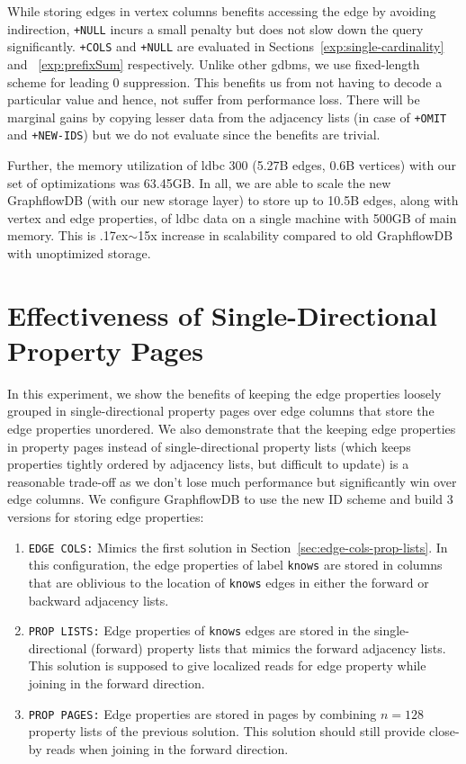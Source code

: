 While storing edges in vertex columns benefits accessing the edge by avoiding indirection, \texttt{+NULL} incurs a small penalty but does not slow down the query significantly. \texttt{+COLS} and \texttt{+NULL} are evaluated in Sections~\ref{exp:single-cardinality} and ~\ref{exp:prefixSum} respectively. Unlike other \gls{gdbms}, we use fixed-length scheme for leading 0 suppression. This benefits us from not having to decode a particular value and hence, not suffer from performance loss. There will be marginal gains by copying lesser data from the adjacency lists (in case of \texttt{+OMIT} and \texttt{+NEW-IDS}) but we do not evaluate since the benefits are trivial.

Further, the memory utilization of \gls{ldbc} 300 (5.27B edges, 0.6B vertices) with our set of optimizations was 63.45GB. In all, we are able to scale the new GraphflowDB (with our new storage layer) to store up to 10.5B edges, along with vertex and edge properties, of \gls{ldbc} data on a single machine with 500GB of main memory. This is {\raise.17ex\hbox{$\scriptstyle\sim$}}15x increase in scalability compared to old GraphflowDB with unoptimized storage.

\section{Effectiveness of Single-Directional Property Pages}
\label{exp:property-pages}

In this experiment, we show the benefits of keeping the edge properties loosely grouped in single-directional property pages over edge columns that store the edge properties unordered. We also demonstrate that the keeping edge properties in property pages instead of single-directional property lists (which keeps properties tightly ordered by adjacency lists, but difficult to update) is a reasonable trade-off as we don't lose much performance but significantly win over edge columns. We configure  GraphflowDB to use the new ID scheme and build 3 versions for storing edge properties:

\begin{enumerate}
	\item \texttt{EDGE COLS:} Mimics the first solution in Section~\ref{sec:edge-cols-prop-lists}. In this configuration, the edge properties of label \texttt{knows} are stored in columns that are oblivious to the location of \texttt{knows} edges in either the forward or backward adjacency lists. 
	\item \texttt{PROP LISTS:} Edge properties of \texttt{knows} edges are stored in the single-directional (forward) property lists that mimics the forward adjacency lists. This solution is supposed to give localized reads for edge property while joining in the forward direction.
	\item \texttt{PROP PAGES:} Edge properties are stored in pages by combining $n=128$ property lists of the previous solution. This solution should still provide close-by reads when joining in the forward direction.
\end{enumerate}


